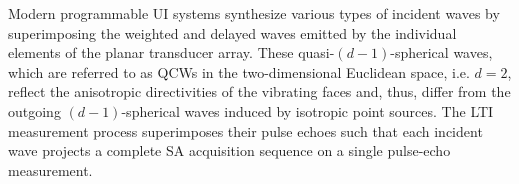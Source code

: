 Modern programmable \ac{UI} systems synthesize
various types of
incident waves by superimposing
the weighted and
delayed waves emitted by
the individual elements of
the planar transducer array.
These quasi-$(d-1)$-spherical waves, which are referred to as
\acp{QCW} in
the two-dimensional Euclidean space, i.e. $d = 2$, reflect
the anisotropic directivities of
the vibrating faces and, thus, differ from
the outgoing $(d-1)$-spherical waves induced by
isotropic point sources.
The \ac{LTI} measurement process superimposes
their pulse echoes such that
each incident wave projects
a complete \ac{SA} acquisition sequence on
a single pulse-echo measurement.

